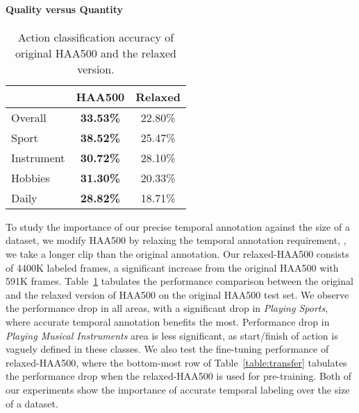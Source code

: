 \documentclass[10pt,twocolumn,letterpaper]{article}
\begin{document}
\vspace{-1em}
\paragraph{Quality versus Quantity}


\begin{table}[t]
    {\small 
    \begin{center}
        \begin{tabular}{l |c |c}
        \hline
          & HAA500  & Relaxed \\
        \hline
        Overall                   & \textbf{33.53\%} & 22.80\% \\
        \:\:\: Sport              & \textbf{38.52\%} & 25.47\% \\ 
        \:\:\: Instrument         & \textbf{30.72\%} & 28.10\% \\ 
        \:\:\: Hobbies            & \textbf{31.30\%} & 20.33\% \\ 
        \:\:\: Daily              & \textbf{28.82\%} & 18.71\% \\
        \hline
        \end{tabular}
    \end{center}
    \vspace{-0.1in}
    \caption{Action classification accuracy of original HAA500 and the relaxed version.}
    \label{table:dirty_basic}}
    \vspace{-0.20in}
\end{table}

To study the importance of our precise temporal annotation against the size of a dataset, we modify HAA500 by relaxing the temporal annotation requirement, \ie, we take a longer clip than the original annotation. 
Our relaxed-HAA500 consists of 4400K labeled frames, a significant increase from the original HAA500 with 591K frames. 
Table~\ref{table:dirty_basic} tabulates the performance comparison between the original and the relaxed version of HAA500 on the original HAA500 test set. 
We observe the performance drop in all areas, with a significant drop in \textit{Playing Sports}, where accurate temporal annotation benefits the most. Performance drop in \textit{Playing Musical Instruments} area is less significant, as start/finish of action is vaguely defined in these classes.
We also test the fine-tuning performance of relaxed-HAA500, where the bottom-most row of Table~\ref{table:transfer} tabulates the performance drop when the relaxed-HAA500 is used for pre-training. Both of our experiments show the importance of accurate temporal labeling over the size of a dataset.
\end{document}
